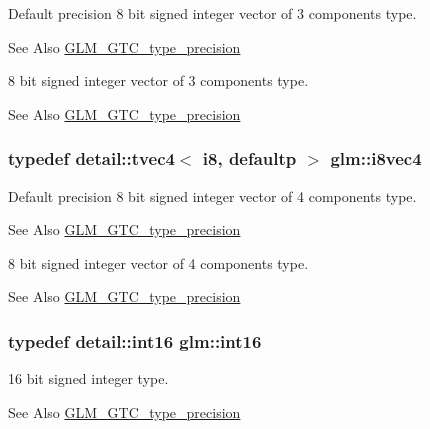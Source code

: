 Default precision 8 bit signed integer vector of 3 components type. \begin{DoxySeeAlso}{See Also}
\hyperlink{group__gtc__type__precision}{G\-L\-M\-\_\-\-G\-T\-C\-\_\-type\-\_\-precision}
\end{DoxySeeAlso}
8 bit signed integer vector of 3 components type. \begin{DoxySeeAlso}{See Also}
\hyperlink{group__gtc__type__precision}{G\-L\-M\-\_\-\-G\-T\-C\-\_\-type\-\_\-precision} 
\end{DoxySeeAlso}
\hypertarget{group__gtc__type__precision_ga89bb5e6481ae11fb2599b71e36a390bb}{
\subsubsection[{i8vec4}]{\setlength{\rightskip}{0pt plus 5cm}typedef detail\-::tvec4$<$ i8, defaultp $>$ {\bf glm\-::i8vec4}}}\label{group__gtc__type__precision_ga89bb5e6481ae11fb2599b71e36a390bb}
Default precision 8 bit signed integer vector of 4 components type. \begin{DoxySeeAlso}{See Also}
\hyperlink{group__gtc__type__precision}{G\-L\-M\-\_\-\-G\-T\-C\-\_\-type\-\_\-precision}
\end{DoxySeeAlso}
8 bit signed integer vector of 4 components type. \begin{DoxySeeAlso}{See Also}
\hyperlink{group__gtc__type__precision}{G\-L\-M\-\_\-\-G\-T\-C\-\_\-type\-\_\-precision} 
\end{DoxySeeAlso}
\hypertarget{group__gtc__type__precision_ga2945a61d12771f8954994fcddf02b021}{
\subsubsection[{int16}]{\setlength{\rightskip}{0pt plus 5cm}typedef detail\-::int16 {\bf glm\-::int16}}}\label{group__gtc__type__precision_ga2945a61d12771f8954994fcddf02b021}
16 bit signed integer type. \begin{DoxySeeAlso}{See Also}
\hyperlink{group__gtc__type__precision}{G\-L\-M\-\_\-\-G\-T\-C\-\_\-type\-\_\-precision} 
\end{DoxySeeAlso}
